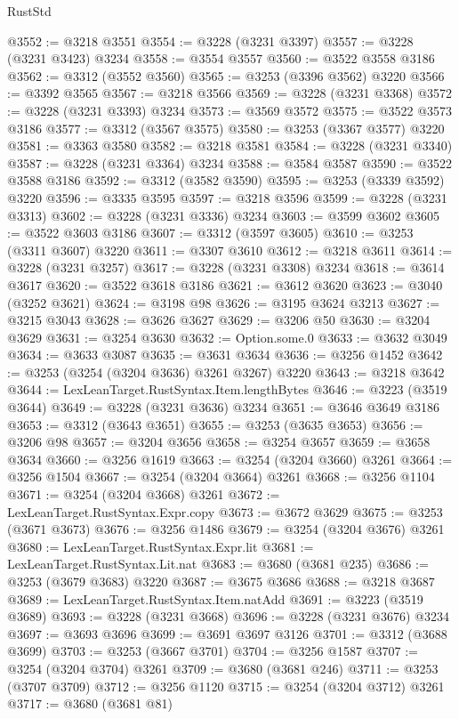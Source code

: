 \begin{lexlean}{RustStd}
\begin{coremodule}
@3552 := @3218 @3551
@3554 := @3228 (@3231 @3397)
@3557 := @3228 (@3231 @3423) @3234
@3558 := @3554 @3557
@3560 := @3522 @3558 @3186
@3562 := @3312 (@3552 @3560)
@3565 := @3253 (@3396 @3562) @3220
@3566 := @3392 @3565
@3567 := @3218 @3566
@3569 := @3228 (@3231 @3368)
@3572 := @3228 (@3231 @3393) @3234
@3573 := @3569 @3572
@3575 := @3522 @3573 @3186
@3577 := @3312 (@3567 @3575)
@3580 := @3253 (@3367 @3577) @3220
@3581 := @3363 @3580
@3582 := @3218 @3581
@3584 := @3228 (@3231 @3340)
@3587 := @3228 (@3231 @3364) @3234
@3588 := @3584 @3587
@3590 := @3522 @3588 @3186
@3592 := @3312 (@3582 @3590)
@3595 := @3253 (@3339 @3592) @3220
@3596 := @3335 @3595
@3597 := @3218 @3596
@3599 := @3228 (@3231 @3313)
@3602 := @3228 (@3231 @3336) @3234
@3603 := @3599 @3602
@3605 := @3522 @3603 @3186
@3607 := @3312 (@3597 @3605)
@3610 := @3253 (@3311 @3607) @3220
@3611 := @3307 @3610
@3612 := @3218 @3611
@3614 := @3228 (@3231 @3257)
@3617 := @3228 (@3231 @3308) @3234
@3618 := @3614 @3617
@3620 := @3522 @3618 @3186
@3621 := @3612 @3620
@3623 := @3040 (@3252 @3621)
@3624 := @3198 @98
@3626 := @3195 @3624 @3213
@3627 := @3215 @3043
@3628 := @3626 @3627
@3629 := @3206 @50
@3630 := @3204 @3629
@3631 := @3254 @3630
@3632 := Option.some.{0}
@3633 := @3632 @3049
@3634 := @3633 @3087
@3635 := @3631 @3634
@3636 := @3256 @1452
@3642 := @3253 (@3254 (@3204 @3636) @3261 @3267) @3220
@3643 := @3218 @3642
@3644 := LexLeanTarget.RustSyntax.Item.lengthBytes
@3646 := @3223 (@3519 @3644)
@3649 := @3228 (@3231 @3636) @3234
@3651 := @3646 @3649 @3186
@3653 := @3312 (@3643 @3651)
@3655 := @3253 (@3635 @3653)
@3656 := @3206 @98
@3657 := @3204 @3656
@3658 := @3254 @3657
@3659 := @3658 @3634
@3660 := @3256 @1619
@3663 := @3254 (@3204 @3660) @3261
@3664 := @3256 @1504
@3667 := @3254 (@3204 @3664) @3261
@3668 := @3256 @1104
@3671 := @3254 (@3204 @3668) @3261
@3672 := LexLeanTarget.RustSyntax.Expr.copy
@3673 := @3672 @3629
@3675 := @3253 (@3671 @3673)
@3676 := @3256 @1486
@3679 := @3254 (@3204 @3676) @3261
@3680 := LexLeanTarget.RustSyntax.Expr.lit
@3681 := LexLeanTarget.RustSyntax.Lit.nat
@3683 := @3680 (@3681 @235)
@3686 := @3253 (@3679 @3683) @3220
@3687 := @3675 @3686
@3688 := @3218 @3687
@3689 := LexLeanTarget.RustSyntax.Item.natAdd
@3691 := @3223 (@3519 @3689)
@3693 := @3228 (@3231 @3668)
@3696 := @3228 (@3231 @3676) @3234
@3697 := @3693 @3696
@3699 := @3691 @3697 @3126
@3701 := @3312 (@3688 @3699)
@3703 := @3253 (@3667 @3701)
@3704 := @3256 @1587
@3707 := @3254 (@3204 @3704) @3261
@3709 := @3680 (@3681 @246)
@3711 := @3253 (@3707 @3709)
@3712 := @3256 @1120
@3715 := @3254 (@3204 @3712) @3261
@3717 := @3680 (@3681 @81)

\end{coremodule}
\end{lexlean}
